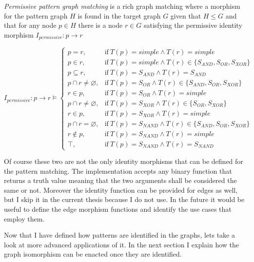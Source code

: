 \begin{definition}\label{def:permissive-matching}
	\textit{Permissive pattern graph matching} is a rich graph matching where a morphism for the pattern graph $H$ is found in the target graph $G$ given that $H \leq G$ and that for any node $p \in H$ there is a node $r \in G$ satisfying the permissive identity morphism $I_{permissive}:p \rightarrow r$
\end{definition}

\begin{equation} \label{eq:permissive}
	I_{permissive}:p \rightarrow r \models
	\begin{cases}
	p = r, & \text{if}\ T(p) = simple \wedge T(r) = simple \\
	p \in r, & \text{if}\ T(p) = simple \wedge T(r) \in \{S_{AND}, S_{OR}, S_{XOR}\} \\
	p \subseteq r, & \text{if}\ T(p) = S_{AND} \wedge T(r) = S_{AND} \\
	p \cap r \neq \varnothing, & \text{if}\ T(p) = S_{OR} \wedge T(r) \in \{S_{AND}, S_{OR}, S_{XOR}\}\\
	r \in p, & \text{if}\ T(p) = S_{OR} \wedge T(r) = simple \\
	p \cap r \neq \varnothing, & \text{if}\ T(p) = S_{XOR} \wedge T(r) \in \{S_{OR}, S_{XOR}\} \\
	r \in p, & \text{if}\ T(p) = S_{XOR} \wedge T(r) = simple \\
	p \cap r = \varnothing, & \text{if}\ T(p) = S_{NAND} \wedge T(r) \in \{S_{AND}, S_{OR}, S_{XOR}\} \\
	r \notin p, & \text{if}\ T(p) = S_{NAND} \wedge T(r) = simple \\
	\top, & \text{if}\ T(p) = S_{NAND} \wedge T(r) = S_{NAND}
	\end{cases}
\end{equation}

Of course these two are not the only identity morphisms that can be defined for the pattern matching. The implementation accepts any binary function that returns a truth value meaning that the two arguments shall be considered the same or not. Moreover the identity function can be provided for edges as well, but I skip it in the current thesis because I do not use. In the future it would be useful to define the edge morphism functions and identify the use cases that employ them.

Now that I have defined how patterns are identified in the graphs, lets take a look at more advanced applications of it. In the next section I explain how the graph isomorphism can be enacted once they are identified. 

